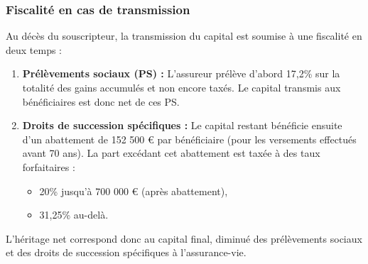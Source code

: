 \subsubsection{Fiscalité en cas de transmission}
\label{sec:fiscalite_transmission}

Au décès du souscripteur, la transmission du capital est soumise à une fiscalité en deux temps :
\begin{enumerate}
    \item \textbf{Prélèvements sociaux (PS) :} L'assureur prélève d'abord 17,2\% sur la totalité des gains accumulés et non encore taxés. Le capital transmis aux bénéficiaires est donc net de ces PS.
    \item \textbf{Droits de succession spécifiques :} Le capital restant bénéficie ensuite d'un abattement de 152 500 € par bénéficiaire (pour les versements effectués avant 70 ans). La part excédant cet abattement est taxée à des taux forfaitaires \cite{bofip_mutations_av}:
    \begin{itemize}
        \item 20\% jusqu'à 700 000 € (après abattement),
        \item 31,25\% au-delà.
    \end{itemize}
\end{enumerate}
L'héritage net correspond donc au capital final, diminué des prélèvements sociaux et des droits de succession spécifiques à l'assurance-vie.
